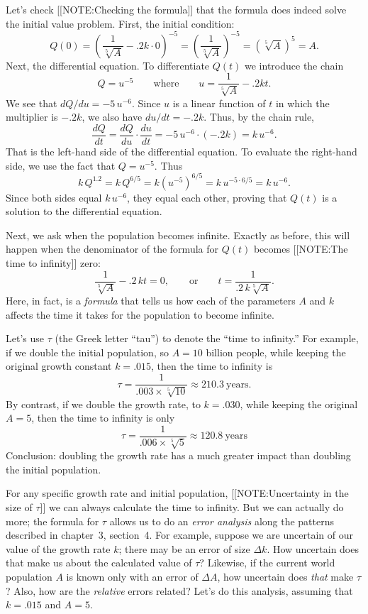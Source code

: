 	Let's check 
	[[NOTE:Checking the formula]]
that the formula does indeed solve the initial value problem.  First, the initial condition:
	\[
Q(0)=\left( \frac{1}{\sqrt[5]{A}} -.2k \cdot 0
		\right)^{-5} =
		\left(\frac{1}{\sqrt[5]{A}}\right)^{-5} =
		(\sqrt[5]{A})^5 = A.
\]
Next, the differential equation.  To differentiate $Q(t)$ we introduce the chain
	\[
Q = u^{-5} \qquad \mbox{where} \qquad 
		u = \frac{1}{\sqrt[5]{A}} -.2kt.
\]
We see that $dQ/du = -5\,u^{-6}$.  Since $u$ is a linear function of $t$ in which the multiplier is $-.2k$, we also have $du/dt = -.2k$.  Thus, by the chain rule,
	\[
\dfrac{dQ}{dt} = \dfrac{dQ}{du} \cdot \dfrac{du}{dt} =
		-5\,u^{-6} \cdot (-.2k) = k\,u^{-6}.
\]
That is the left-hand side of the differential equation.  To evaluate the right-hand side, we use the fact that $Q = 
u^{-5}$.  Thus
	\[
k\,Q^{1.2} = k\,Q^{6/5} = k(u^{-5})^{6/5} = 
		k\,u^{-5 \cdot 6/5} = k\,u^{-6}.
\]
Since both sides equal $k\,u^{-6}$, they equal each other, proving that $Q(t)$ is a solution to the differential equation.

Next, we ask when the population becomes infinite.  Exactly as before,
this will happen when the denominator of the formula for $Q(t)$
becomes
[[NOTE:The time to infinity]]
zero:
	\[
\dfrac{1}{\sqrt[5]{A}} - .2\,kt = 0, \qquad \mbox{or}
		\qquad t = \dfrac{1}{.2\,k\sqrt[5]{A}}.
\]
Here, in fact, is a {\em formula\/} that tells us how each of the parameters $A$ and $k$ affects the time it takes for the population to become infinite.

	Let's use $\tau$ (the Greek letter ``tau'') to denote the ``time to infinity.''  For example, if we double the initial population, so $A = 10$ billion people, while keeping the original growth constant $k = .015$, then the time to infinity is
	\[
\tau = \dfrac{1}{.003 \times \sqrt[5]{10}} \approx
		 210.3 \ \mbox{years}.
\]
By contrast, if we double the growth rate, to $k = .030$, while keeping the original $A = 5$, then the time to infinity is only
	\[
\tau = \dfrac{1}{.006 \times \sqrt[5]{5}} \approx
		120.8 \ \mbox{years}
\]
Conclusion: doubling the growth rate has a much greater impact than doubling the initial population.  

\label{supergrowth errors-begin}
For any specific growth rate and initial population, 
[[NOTE:Uncertainty in  the size of $\tau$]]
we can always calculate the time to infinity.  But we can actually do
more; the formula for $\tau$ allows us to do an {\em error
  analysis\/} along the patterns described in
chapter~3, section~4.  For example, suppose we are uncertain of our
value of the growth rate $k$; there may be an error of size $\Delta
k$.  How uncertain does that make us about the calculated value of
$\tau$?  Likewise, if the current world population $A$ is known only
with an error of $\Delta A$, how uncertain does {\em that\/} make
$\tau$?  Also, how are the {\em relative\/} errors related?  Let's do
this analysis, assuming that $k = .015$ and $A = 5$.

